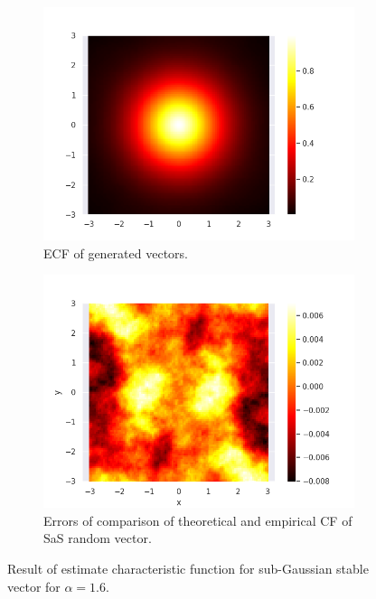 \documentclass{article}
\begin{document}
	\begin{figure}
		\centering
		\begin{subfigure}[H]{0.49\textwidth}
			\centering
			\includegraphics[width=1\linewidth]{images/ex_2_ecf}
			\caption{ECF of generated vectors.}\label{7}
		\end{subfigure}
		\hfill
		\begin{subfigure}[H]{0.49\textwidth}
			\centering
			\includegraphics[width=1\linewidth]{images/ex_2_error_heatmap}
			\caption{Errors of comparison of theoretical and empirical CF of SaS random vector.}\label{8}
		\end{subfigure}
		\caption{Result of estimate characteristic function for sub-Gaussian stable vector for $\alpha = 1.6$.}
	\end{figure}
	
\end{document}
